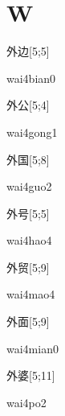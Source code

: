 ﻿%
\section*{W}

\begin{verbete}{外边}[5;5]
\begin{pronuncia}{wai4bian0}
\end{pronuncia}
\end{verbete}

\begin{verbete}{外公}[5;4]
\begin{pronuncia}{wai4gong1}
\end{pronuncia}
\end{verbete}

\begin{verbete}{外国}[5;8]
\begin{pronuncia}{wai4guo2}
\end{pronuncia}
\end{verbete}

\begin{verbete}{外号}[5;5]
\begin{pronuncia}{wai4hao4}
\end{pronuncia}
\end{verbete}

\begin{verbete}{外贸}[5;9]
\begin{pronuncia}{wai4mao4}
\end{pronuncia}
\end{verbete}

\begin{verbete}{外面}[5;9]
\begin{pronuncia}{wai4mian0}
\end{pronuncia}
\end{verbete}

\begin{verbete}[wai4po2]{外婆}[5;11]
\begin{pronuncia}{wai4po2}
\end{pronuncia}
\end{verbete}

